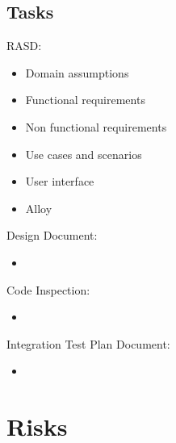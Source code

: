 \documentclass{article}
\begin{document}
\subsection{Tasks}
RASD:
\begin{itemize}
	\item Domain assumptions
	\item Functional requirements
	\item Non functional requirements
	\item Use cases and scenarios
	\item User interface
	\item Alloy
\end{itemize}
Design Document:
\begin{itemize}
	\item
\end{itemize}
Code Inspection:
\begin{itemize}
	\item
\end{itemize}
Integration Test Plan Document:
\begin{itemize}
	\item 
\end{itemize}
\section{Risks}
\end{document}
